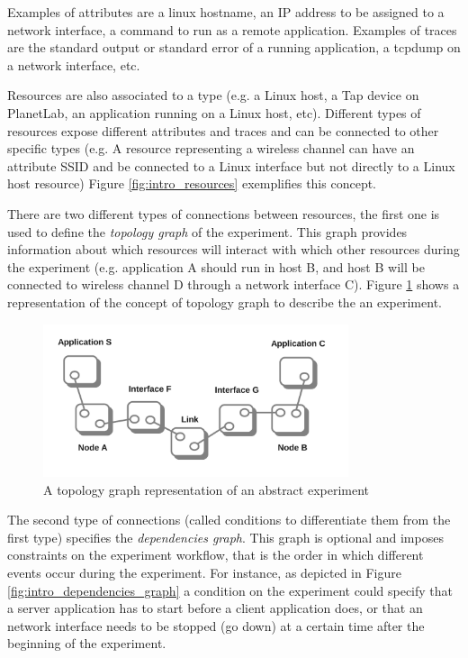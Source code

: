 Examples of attributes are a linux hostname, an IP address to be 
assigned to a network interface, a command to run as a remote application.
Examples of traces are the standard output or standard error of a
running application, a tcpdump on a network interface, etc.

Resources are also associated to a type (e.g. a Linux host, 
a Tap device on PlanetLab, an application running on a Linux host, etc).
Different types of resources expose different attributes and traces
and can be connected to other specific types (e.g. A resource representing
a wireless channel can have an attribute SSID and be connected to a 
Linux interface but not directly to a Linux host resource)
Figure \ref{fig:intro_resources} exemplifies this concept.

There are two different types of connections between resources, the 
first one is used to define the \emph{topology graph} of the experiment.
This graph provides information about which resources will interact
with which other resources during the experiment
(e.g. application A should run in host B, and host B will be connected
to wireless channel D through a network interface C).
Figure \ref{fig:intro_topo_graph} shows a representation of the concept of
topology graph to describe the an experiment.

\begin{figure}[h]
  \centering
  \includegraphics[width=0.8\textwidth]{intro_topo_graph}
  \caption{A topology graph representation of an abstract experiment}
  \label{fig:intro_topo_graph}
\end{figure}

The second type of connections (called conditions to differentiate them 
from the first type) specifies the \emph{dependencies graph}. 
This graph is optional and imposes constraints on the experiment 
workflow, that is the order in which different events occur during the 
experiment. For instance, as depicted in Figure \ref{fig:intro_dependencies_graph}
a condition on the experiment could specify that
a server application has to start before a client application does, or that
an network interface needs to be stopped (go down) at a certain time after
the beginning of the experiment. 

